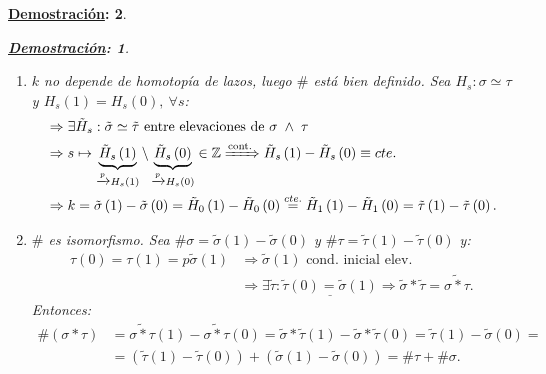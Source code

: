 \documentclass[10pt,a4paper,openright]{book}
\theoremstyle{break}
\newtheorem*{demo}{\underline{Demostración}:}
\begin{document}
\begin{demo}
\begin{demo}
\begin{enumerate}
        \item $k$ no depende de homotopía de lazos, luego $\#$ está bien definido. Sea $H_s: \sigma \simeq \tau$ y $H_s\left( 1 \right) = H_s\left( 0 \right),\ \forall s$:
        \begin{align*}
            &\Rightarrow \exists \tilde{H}_s: \tilde{\sigma} \simeq \tilde{\tau} \text{ entre elevaciones de } \sigma\; \land \;\tau\\
            &\Rightarrow s \mapsto \underbrace{\tilde{H}_s\left( 1 \right)}_{\xrightarrow{p} H_s\left( 1 \right) }  \setminus \underbrace{\tilde{H}_s\left( 0 \right)}_{\xrightarrow{p} H_s\left( 0 \right)} \in \mathbb{Z} \xRightarrow{\text{cont.}} \tilde{H}_s\left( 1 \right) - \tilde{H}_s\left( 0 \right) \equiv cte.\\
            &\Rightarrow k = \tilde{\sigma} \left( 1 \right) - \tilde{\sigma} \left( 0 \right) = \tilde{H}_0\left( 1 \right) - \tilde{H}_0\left( 0 \right) \stackrel{cte.}{=} \tilde{H}_1\left( 1 \right) - \tilde{H}_1\left( 0 \right) = \tilde{\tau} \left( 1 \right) - \tilde{\tau} \left( 0 \right)  
        .\end{align*}

        \item $\#$ es isomorfismo. Sea $\# \sigma = \tilde{\sigma} \left( 1 \right) - \tilde{\sigma} \left( 0 \right)$ y $\# \tau = \tilde{\tau} \left( 1 \right) - \tilde{\tau} \left( 0 \right)$ y:
        \begin{align*}
            \tau\left( 0 \right) = \tau\left( 1 \right) = p \tilde{\sigma} \left( 1 \right) &\Rightarrow \tilde{\sigma} \left( 1 \right) \text{ cond. inicial elev.} \\
            &\Rightarrow \exists \tilde{\tau} : \underline{\tilde{\tau} \left( 0 \right) = \tilde{\sigma} \left( 1 \right)} \Rightarrow \tilde{\sigma} * \tilde{\tau} = \tilde{\sigma * \tau} 
        .\end{align*}
        Entonces:
        \begin{align*}
            \# \left( \sigma * \tau \right) &= \tilde{\sigma * \tau} \left( 1 \right) - \tilde{\sigma * \tau} \left( 0 \right) = \tilde{\sigma} * \tilde{\tau} \left( 1 \right) - \tilde{\sigma} * \tilde{\tau} \left( 0 \right) = \tilde{\tau} \left( 1 \right) - \tilde{\sigma} \left( 0 \right) =\\
            &= \left( \tilde{\tau} \left( 1 \right) - \tilde{\tau} \left( 0 \right) \right) + \left( \tilde{\sigma} \left( 1 \right) - \tilde{\sigma} \left( 0 \right) \right) = \# \tau + \# \sigma
        .\end{align*}


\end{enumerate}
\end{demo}
\end{demo}
\end{document}
